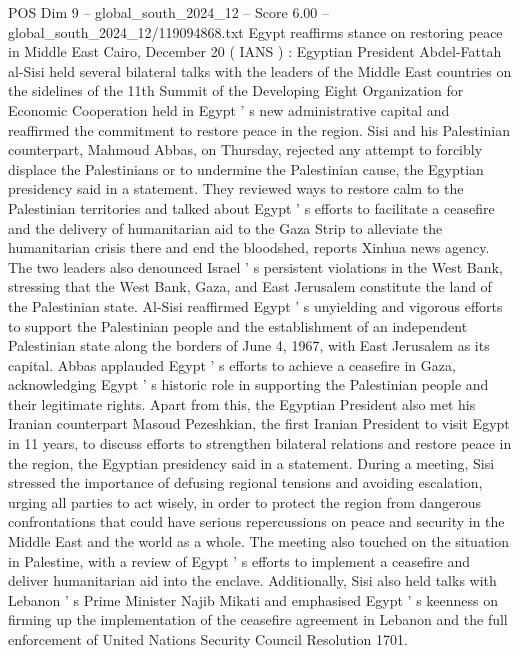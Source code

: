 \begin{textsample}{POS Dim 9 – global\_south\_2024\_12 – Score 6.00 – global\_south\_2024\_12/119094868.txt}  \label{ex:f9_pos_327}
Egypt reaffirms stance on restoring peace in Middle East Cairo, December 20 ( IANS ) : Egyptian President Abdel-Fattah al-Sisi held several bilateral talks with the leaders of the Middle East countries on the sidelines of the 11th Summit of the Developing Eight Organization for Economic Cooperation held in Egypt ' s new administrative capital and reaffirmed the commitment to restore peace in the region.
Sisi and his Palestinian counterpart, Mahmoud Abbas, on Thursday, rejected any attempt to forcibly displace the Palestinians or to undermine the Palestinian cause, the Egyptian presidency said in a statement.
They reviewed ways to restore calm to the Palestinian territories and talked about Egypt ' s efforts to facilitate a ceasefire and the delivery of humanitarian aid to the Gaza Strip to alleviate the humanitarian crisis there and end the bloodshed, reports Xinhua news agency.
The two leaders also denounced Israel ' s persistent violations in the West Bank, stressing that the West Bank, Gaza, and East Jerusalem constitute the land of the Palestinian state.
Al-Sisi reaffirmed Egypt ' s unyielding and vigorous efforts to support the Palestinian people and the establishment of an independent Palestinian state along the borders of June 4, 1967, with East Jerusalem as its capital.
Abbas applauded Egypt ' s efforts to achieve a ceasefire in Gaza, acknowledging Egypt ' s historic role in supporting the Palestinian people and their legitimate rights.
Apart from this, the Egyptian President also met his Iranian counterpart Masoud Pezeshkian, the first Iranian President to visit Egypt in 11 years, to discuss efforts to strengthen bilateral relations and restore peace in the region, the Egyptian presidency said in a statement.
During a meeting, Sisi stressed the importance of defusing regional tensions and avoiding escalation, urging all parties to act wisely, in order to protect the region from dangerous confrontations that could have serious repercussions on peace and security in the Middle East and the world as a whole.
The meeting also touched on the situation in Palestine, with a review of Egypt ' s efforts to implement a ceasefire and deliver humanitarian aid into the enclave.
Additionally, Sisi also held talks with Lebanon ' s Prime Minister Najib Mikati and emphasised Egypt ' s keenness on firming up the implementation of the ceasefire agreement in Lebanon and the full enforcement of United Nations Security Council Resolution 1701.

\end{textsample}
